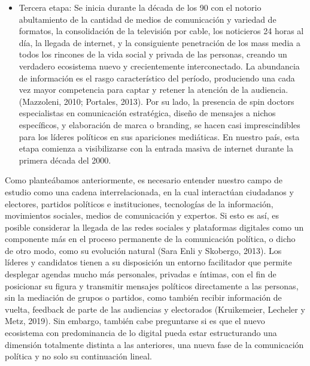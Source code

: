 \documentclass[
  10pt,
  letterpaper,
]{report}
\begin{document}
\begin{itemize}
  fase se observa con posterioridad, en parte por las alteraciones que
  produjo la dictadura militar (1973-1990), y se instala con mayor
  fuerza recién entrada la década de los 90, con la masificación de la
  televisión y de las campañas mediatizadas asesoradas por expertos en
  construcción de imagen y discurso
\item
  Tercera etapa: Se inicia durante la década de los 90 con el notorio
  abultamiento de la cantidad de medios de comunicación y variedad de
  formatos, la consolidación de la televisión por cable, los noticieros
  24 horas al día, la llegada de internet, y la consiguiente penetración
  de los mass media a todos los rincones de la vida social y privada de
  las personas, creando un verdadero ecosistema nuevo y crecientemente
  interconectado. La abundancia de información es el rasgo
  característico del período, produciendo una cada vez mayor competencia
  para captar y retener la atención de la audiencia. (Mazzoleni, 2010;
  Portales, 2013). Por su lado, la presencia de spin doctors
  especialistas en comunicación estratégica, diseño de mensajes a nichos
  específicos, y elaboración de marca o branding, se hacen casi
  imprescindibles para los líderes políticos en sus apariciones
  mediáticas. En nuestro país, esta etapa comienza a visibilizarse con
  la entrada masiva de internet durante la primera década del 2000.
\end{itemize}

Como planteábamos anteriormente, es necesario entender nuestro campo de
estudio como una cadena interrelacionada, en la cual interactúan
ciudadanos y electores, partidos políticos e instituciones, tecnologías
de la información, movimientos sociales, medios de comunicación y
expertos. Si esto es así, es posible considerar la llegada de las redes
sociales y plataformas digitales como un componente más en el proceso
permanente de la comunicación política, o dicho de otro modo, como su
evolución natural (Sara Enli y Skobergo, 2013). Los líderes y candidatos
tienen a su disposición un entorno facilitador que permite desplegar
agendas mucho más personales, privadas e íntimas, con el fin de
posicionar su figura y transmitir mensajes políticos directamente a las
personas, sin la mediación de grupos o partidos, como también recibir
información de vuelta, feedback de parte de las audiencias y electorados
(Kruikemeier, Lecheler y Metz, 2019). Sin embargo, también cabe
preguntarse si es que el nuevo ecosistema con predominancia de lo
digital pueda estar estructurando una dimensión totalmente distinta a
las anteriores, una nueva fase de la comunicación política y no solo su
continuación lineal.
\end{document}
